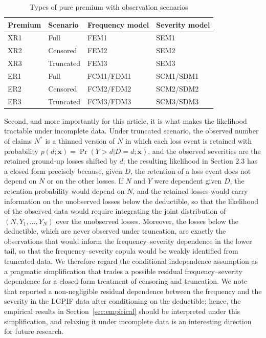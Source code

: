 \documentclass[11pt]{article}
\newcommand{\rev}[1]{{\color{blue}#1}}
\begin{document}
\begin{table}[h!]
\centering
\begin{tabular}{llll}
\hline
Premium & Scenario & Frequency model & Severity model \\
\midrule
XR1 & Full & FEM1 & SEM1 \\
XR2 & Censored & FEM2 & SEM2 \\
XR3 & Truncated & FEM3 & SEM3 \\
\midrule
ER1 & Full & FCM1/FDM1 & SCM1/SDM1 \\
ER2 & Censored & FCM2/FDM2 & SCM2/SDM2 \\
ER3 & Truncated & FCM3/FDM3 & SCM3/SDM3 \\
\bottomrule
\end{tabular}
\caption{Types of pure premium with observation scenarios}
\label{tab:ratemaking}
\end{table}

 \rev{Second, and more importantly for this article, it is what makes the likelihood tractable under incomplete data. Under truncated scenario, the observed number of claims $N^*$ is a thinned version of $N$ in which each loss event is retained with probability $p(d;\bm{x})=\Pr(Y>d|D=d;\bm{x})$, and the observed severities are the retained ground-up losses shifted by $d$; the resulting likelihood in Section 2.3 has a closed form precisely because, given $D$, the retention of a loss event does not depend on $N$ or on the other losses. If $N$ and $Y$ were dependent given $D$, the retention probability would depend on $N$, and the retained losses would carry information on the unobserved losses below the deductible, so that the likelihood of the observed data would require integrating the joint distribution of $(N,Y_1,\ldots,Y_{N})$ over the unobserved losses. Moreover, the losses below the deductible, which are never observed under truncation, are exactly the observations that would inform the frequency--severity dependence in the lower tail, so that the frequency--severity copula would be weakly identified from truncated data. We therefore regard the conditional independence assumption as a pragmatic simplification that trades a possible residual frequency--severity dependence for a closed-form treatment of censoring and truncation. We note that \citet{shi2022copula} reported a non-negligible residual dependence between the frequency and the severity in the LGPIF data after conditioning on the deductible; hence, the empirical results in Section~\ref{sec:empirical} should be interpreted under this simplification, and relaxing it under incomplete data is an interesting direction for future research.}
\end{document}
